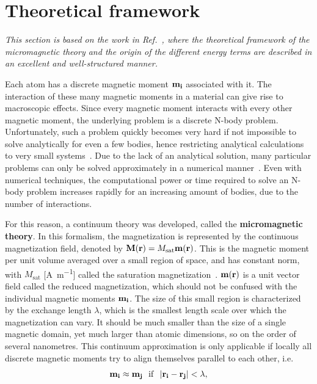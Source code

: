 \documentclass[11pt,a4paper,english]{article}
\begin{document}
\section{Theoretical framework}
\label{par:Physics}
\begin{center}
    \textit{This section is based on the work in Ref.~\cite{abert2013discrete}, where the theoretical framework of the micromagnetic theory and the origin of the different energy terms are described in an excellent and well-structured manner.}
\end{center}
Each atom has a discrete magnetic moment $\vb{m_i}$ associated with it. The interaction of these many magnetic moments in a material can give rise to macroscopic effects. Since every magnetic moment interacts with every other magnetic moment, the underlying problem is a discrete N-body problem. Unfortunately, such a problem quickly becomes very hard if not impossible to solve analytically for even a few bodies, hence restricting analytical calculations to very small systems~\cite{abert2013discrete}. Due to the lack of an analytical solution, many particular problems can only be solved approximately in a numerical manner~\cite{abert2013discrete}. Even with numerical techniques, the computational power or time required to solve an N-body problem increases rapidly for an increasing amount of bodies, due to the number of interactions. \par
For this reason, a continuum theory was developed, called the \textbf{micromagnetic theory}. In this formalism, the magnetization is represented by the continuous magnetization field, denoted by $\vb{M}(\vb{r}) = M_\mathrm{sat} \vb{m}(\vb{r})$. This is the magnetic moment per unit volume averaged over a small region of space, and has constant norm, with $M_\mathrm{sat}$ [\si{\ampere\per\metre}] called the saturation magnetization~\cite{Gilbert1956}. $\vb{m}(\vb{r})$ is a unit vector field called the reduced magnetization, which should not be confused with the individual magnetic moments $\vb{m_i}$.
The size of this small region is characterized by the exchange length $\lambda$, which is the smallest length scale over which the magnetization can vary. It should be much smaller than the size of a single magnetic domain, yet much larger than atomic dimensions, so on the order of several nanometres. This continuum approximation is only applicable if locally all discrete magnetic moments try to align themselves parallel to each other, i.e.
\begin{equation}
    \vb{m_i} \approx \vb{m_j}~~\mathrm{if}~~\abs{\vb{r_i} - \vb{r_j}} < \lambda \mathrm{,}
\end{equation}
\end{document}
